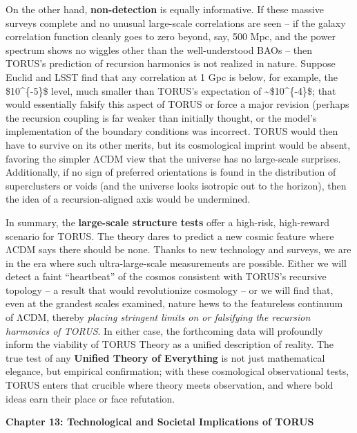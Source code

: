 On the other hand, \textbf{non-detection} is equally informative. If
these massive surveys complete and no unusual large-scale correlations
are seen -- if the galaxy correlation function cleanly goes to zero
beyond, say, 500 Mpc, and the power spectrum shows no wiggles other than
the well-understood BAOs -- then TORUS's prediction of recursion
harmonics is not realized in nature. Suppose Euclid and LSST find that
any correlation at 1 Gpc is below, for example, the \$10\^{}\{-5\}\$
level, much smaller than TORUS's expectation of
\textasciitilde{}\$10\^{}\{-4\}\$; that would essentially falsify this
aspect of TORUS or force a major revision (perhaps the recursion
coupling is far weaker than initially thought, or the model's
implementation of the boundary conditions was incorrect. TORUS would
then have to survive on its other merits, but its cosmological imprint
would be absent, favoring the simpler ΛCDM view that the universe has no
large-scale surprises. Additionally, if no sign of preferred
orientations is found in the distribution of superclusters or voids (and
the universe looks isotropic out to the horizon), then the idea of a
recursion-aligned axis would be undermined.

In summary, the \textbf{large-scale structure tests} offer a high-risk,
high-reward scenario for TORUS. The theory dares to predict a new cosmic
feature where ΛCDM says there should be none. Thanks to new technology
and surveys, we are in the era where such ultra-large-scale measurements
are possible. Either we will detect a faint ``heartbeat'' of the cosmos
consistent with TORUS's recursive topology -- a result that would
revolutionize cosmology -- or we will find that, even at the grandest
scales examined, nature hews to the featureless continuum of ΛCDM,
thereby \emph{placing stringent limits on or falsifying the recursion
harmonics of TORUS}. In either case, the forthcoming data will
profoundly inform the viability of TORUS Theory as a unified description
of reality. The true test of any \textbf{Unified Theory of Everything}
is not just mathematical elegance, but empirical confirmation; with
these cosmological observational tests, TORUS enters that crucible where
theory meets observation, and where bold ideas earn their place or face
refutation.

\textbf{Chapter 13: Technological and Societal Implications of TORUS}

